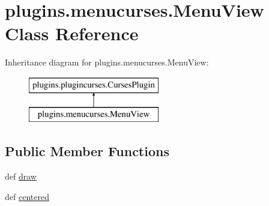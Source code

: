 \hypertarget{classplugins_1_1menucurses_1_1_menu_view}{\section{plugins.\-menucurses.\-Menu\-View \-Class \-Reference}
\label{classplugins_1_1menucurses_1_1_menu_view}
}
\-Inheritance diagram for plugins.\-menucurses.\-Menu\-View\-:\begin{figure}[H]
\begin{center}
\leavevmode
\includegraphics[height=2.000000cm]{classplugins_1_1menucurses_1_1_menu_view}
\end{center}
\end{figure}
\subsection*{\-Public \-Member \-Functions}
\begin{DoxyCompactItemize}
\item 
def \hyperlink{classplugins_1_1menucurses_1_1_menu_view_af154e09aa06242990466fd46e1d851ce}{draw}
\item 
def \hyperlink{classplugins_1_1menucurses_1_1_menu_view_a2957f01568ba90d58eadb68538b03c26}{centered}
\end{DoxyCompactItemize}
